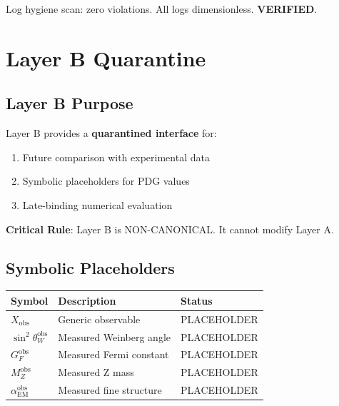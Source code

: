 \documentclass[11pt,a4paper]{article}
\begin{document}
\begin{trapbox}
\label{trap:rt15}
Log hygiene scan: zero violations. All logs dimensionless. \textbf{VERIFIED}.
\end{trapbox}

\section{Layer B Quarantine}
\label{app:layer-b}

\subsection{Layer B Purpose}
\label{app:layer-b-purpose}

\begin{layerbbox}
\label{box:layer-b-purpose}
Layer B provides a \textbf{quarantined interface} for:
\begin{enumerate}
    \item Future comparison with experimental data
    \item Symbolic placeholders for PDG values
    \item Late-binding numerical evaluation
\end{enumerate}

\textbf{Critical Rule}: Layer B is NON-CANONICAL. It cannot modify Layer A.
\end{layerbbox}

\subsection{Symbolic Placeholders}
\label{app:placeholders}

\begin{layerbbox}
\label{box:placeholders}
\begin{center}
\begin{tabular}{lll}
\toprule
\textbf{Symbol} & \textbf{Description} & \textbf{Status} \\
\midrule
$X_{\text{obs}}$ & Generic observable & PLACEHOLDER \\
$\sin^2\theta_W^{\text{obs}}$ & Measured Weinberg angle & PLACEHOLDER \\
$G_F^{\text{obs}}$ & Measured Fermi constant & PLACEHOLDER \\
$M_Z^{\text{obs}}$ & Measured Z mass & PLACEHOLDER \\
$\alpha_{\text{EM}}^{\text{obs}}$ & Measured fine structure & PLACEHOLDER \\
\bottomrule
\end{tabular}
\end{center}
\end{layerbbox}
\end{document}
